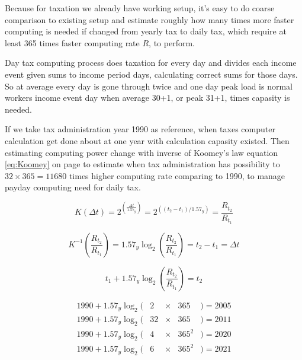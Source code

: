 Because for taxation we already have working setup, it's easy to do coarse
comparison to existing setup and estimate roughly how many times more faster
computing is needed if changed from yearly tax to daily tax, which require at
least 365 times faster computing rate $R$, to perform.

Day tax computing process does taxation for every day and divides each
income event given sums to income period days, calculating correct sums for
those days. So at average every day is gone through twice and one day peak
load is normal workers income event day when average 30+1, or peak 31+1,
times capasity is needed.

If we take tax administration year 1990\cite{VeroItDeployment} as reference,
when taxes computer calculation get done about at one year with calculation
capasity existed. Then estimating computing power change with inverse of
Koomey's law\cite{KoomeysLaw}\cite{DennartScaling}\cite{PerformanceDevelTop500}
equation \ref{eq:Koomey} on page \pageref{eq:Koomey} to estimate when tax
administration has possibility to $32\times 365 = 11680$ times higher
computing rate comparing to 1990, to manage payday computing need for daily
tax.

\begin{equation} \label{eq:Koomey}
	K(\Delta t) =
	2^{(\frac{\Delta t}{1.57_y})} =
	2^{((t_2-t_1)/1.57_y)} =
	\frac{R_{t_2}}{R_{t_1}}
\end{equation}

\begin{equation} \label{eq:InverseKoomey}
	K^{-1}(\frac{R_{t_2}}{R_{t_1}}) =
	1.57_y \log_2(\frac{R_{t_2}}{R_{t_1}}) =
	t_2 - t_1 =
	\Delta t
\end{equation}

\begin{equation} \label{eq:InverseKoomeyTime}
t_1 + 1.57_y \log_2(\frac{R_{t_2}}{R_{t_1}}) = t_2
\end{equation}

\begin{equation} \label{eq:InverseKoomeyTime20052021}
 \begin{array}{lrcll}
	 1990 + 1.57_y \log_2(& 2&\times&365  &) = 2005 \\
	 1990 + 1.57_y \log_2(&32&\times&365  &) = 2011 \\
	 1990 + 1.57_y \log_2(& 4&\times&365^2&) = 2020 \\
	 1990 + 1.57_y \log_2(& 6&\times&365^2&) = 2021
 \end{array}
\end{equation}

